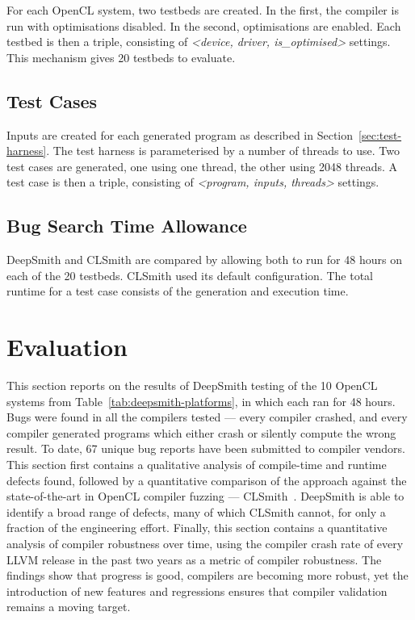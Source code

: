 For each OpenCL system, two testbeds are created. In the first, the compiler is run with optimisations disabled. In the second, optimisations are enabled. Each testbed is then a triple, consisting of \emph{\textless device, driver, is\_optimised\textgreater} settings. This mechanism gives 20 testbeds to evaluate.


\subsection{Test Cases}

Inputs are created for each generated program as described in Section~\ref{sec:test-harness}. The test harness is parameterised by a number of threads to use. Two test cases are generated, one using one thread, the other using 2048 threads. A test case is then a triple, consisting of \emph{\textless program, inputs, threads\textgreater} settings.

\subsection{Bug Search Time Allowance}

DeepSmith and CLSmith are compared by allowing both to run for 48 hours on each of the 20 testbeds. CLSmith used its default configuration. The total runtime for a test case consists of the generation and execution time.


\section{Evaluation}
\label{sec:deepsmith-eval}

This section reports on the results of DeepSmith testing of the 10 OpenCL systems from Table~\ref{tab:deepsmith-platforms}, in which each ran for 48 hours. Bugs were found in all the compilers tested --- every compiler crashed, and every compiler generated programs which either crash or silently compute the wrong result. To date, 67 unique bug reports have been submitted to compiler vendors. This section first contains a qualitative analysis of compile-time and runtime defects found, followed by a quantitative comparison of the approach against the state-of-the-art in OpenCL compiler fuzzing --- CLSmith~\cite{Lidbury2015a}. DeepSmith is able to identify a broad range of defects, many of which CLSmith cannot, for only a fraction of the engineering effort. Finally, this section contains a quantitative analysis of compiler robustness over time, using the compiler crash rate of every LLVM release in the past two years as a metric of compiler robustness. The findings show that progress is good, compilers are becoming more robust, yet the introduction of new features and regressions ensures that compiler validation remains a moving target.

